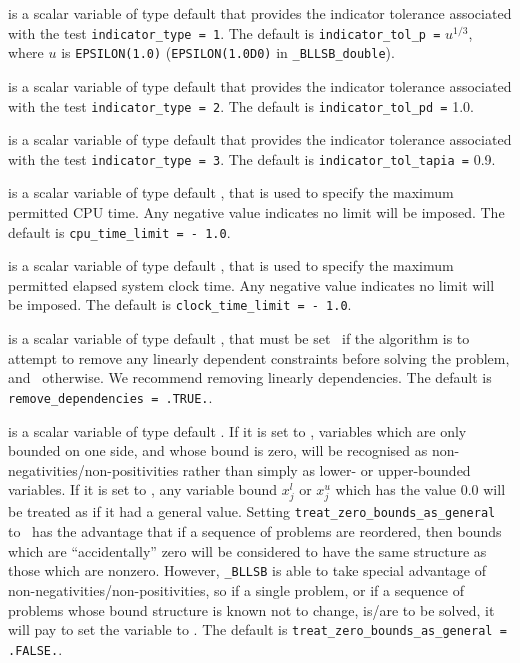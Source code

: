 \documentclass{galahad}
\newcommand{\packagename}{BLLSB}
\newcommand{\fullpackagename}{\libraryname\_\packagename}
\begin{document}
\begin{description}
is a scalar variable of type default \realdp that
provides the indicator tolerance associated with the test
{\tt indicator\_type = 1}.
The default is {\tt indicator\_tol\_p =} $u^{1/3}$,
where $u$ is {\tt EPSILON(1.0)} ({\tt EPSILON(1.0D0)} in
{\tt \fullpackagename\_double}).

is a scalar variable of type default \realdp that
provides the indicator tolerance associated with the test
{\tt indicator\_type = 2}.
The default is {\tt indicator\_tol\_pd =} 1.0.

is a scalar variable of type default \realdp that
provides the indicator tolerance associated with the test
{\tt indicator\_type = 3}.
The default is {\tt indicator\_tol\-\_tapia =} 0.9.

 is a scalar variable of type default \realdp,
that is used to specify the maximum permitted CPU time. Any negative
value indicates no limit will be imposed. The default is
{\tt cpu\_time\_limit = - 1.0}.

 is a scalar variable of type default \realdp,
that is used to specify the maximum permitted elapsed system clock time.
Any negative value indicates no limit will be imposed. The default is
{\tt clock\_time\_limit = - 1.0}.

 is a scalar variable of type
default \logical, that must be set \true\ if the algorithm
is to attempt to remove any linearly dependent constraints before
solving the problem, and \false\ otherwise.
We recommend removing linearly dependencies.
The default is {\tt remove\_dependencies = .TRUE.}.

 is a scalar variable of type
default \logical.
If it is set to \false, variables which
are only bounded on one side, and whose bound is zero,
will be recognised as non-negativities/non-positivities rather than simply as
lower- or upper-bounded variables.
If it is set to \true, any variable bound
$x_{j}^{l}$ or $x_{j}^{u}$ which has the value 0.0 will be
treated as if it had a general value.
Setting {\tt treat\_zero\_bounds\_as\_general} to \true\ has the advantage
that if a sequence of problems are reordered, then bounds which are
``accidentally'' zero will be considered to have the same structure as
those which are nonzero. However, {\tt \fullpackagename} is
able to take special advantage of non-negativities/non-positivities, so
if a single problem, or if a sequence of problems whose
bound structure is known not to change, is/are to be solved,
it will pay to set the variable to \false.
The default is {\tt treat\_zero\_bounds\_as\_general = .FALSE.}.


\end{description}
\end{document}
